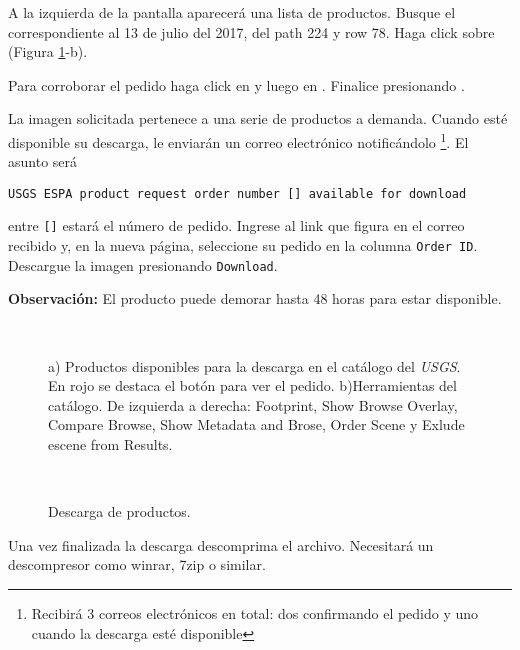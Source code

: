 A la izquierda de la pantalla aparecerá una lista de productos. Busque el correspondiente al 13 de julio del 2017, del path 224 y row 78. Haga click sobre  (Figura \ref{fig:descarga}-b).

Para corroborar el pedido haga click en  y luego en . Finalice presionando .

La imagen solicitada pertenece a una serie de productos a demanda.  Cuando  esté disponible su descarga, le enviarán un correo electrónico notificándolo \footnote{Recibirá 3 correos electrónicos en total: dos confirmando el pedido y uno cuando la descarga esté disponible}. El asunto será

\begin{center}
\texttt{USGS ESPA product request order number [] available for download}
\end{center}

entre \texttt{[]} estará el número de pedido. Ingrese al link que figura en el correo recibido y, en la nueva página, seleccione su pedido en la columna \texttt{Order ID}. Descargue la imagen presionando \texttt{Download}.

\textbf{Observación:} El producto puede demorar hasta 48 horas para estar disponible.

\begin{figure}[H]
    \centering
    \\
    \caption{a) Productos disponibles para la descarga en el catálogo del \emph{USGS}. En rojo se destaca el botón para ver el pedido. b)Herramientas del catálogo. De izquierda a derecha: Footprint, Show Browse Overlay, Compare Browse, Show Metadata and Brose, Order Scene y Exlude escene from Results.}
    \label{fig:descarga}
\end{figure}



\begin{figure}[h!]
    \centering
    \\
    \caption{Descarga de productos.}
    \label{fig:descarga2}
\end{figure}

Una vez finalizada la descarga descomprima el archivo. Necesitará un descompresor como winrar, 7zip o similar.

